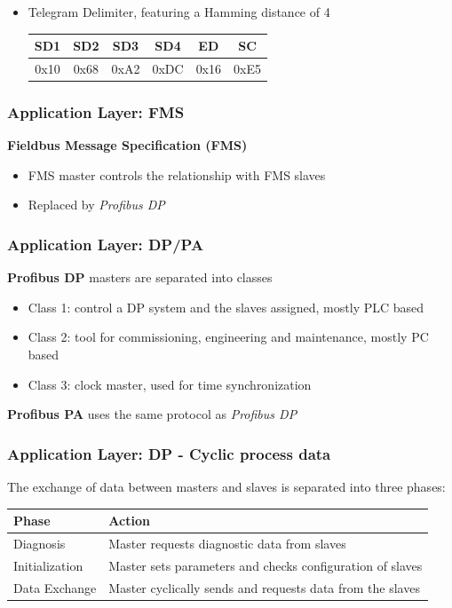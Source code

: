 \documentclass{beamer}
\begin{document}
\begin{frame}
\begin{itemize}
      \hfill \\
    \item Telegram Delimiter, featuring a Hamming distance of 4 \\
      \footnotesize
      \begin{tabular}[h]{|c|c|c|c|c|c|}
        \hline
        SD1   & SD2   & SD3   & SD4   & ED    & SC \\
        \hline
        0x10  & 0x68  & 0xA2  & 0xDC  & 0x16  & 0xE5 \\
        \hline
      \end{tabular}
      \normalsize
  \end{itemize}
\end{frame}

\begin{frame}
  \frametitle{Application Layer: FMS}
  \textbf{Fieldbus Message Specification (FMS)}
  \begin{itemize}
    \item FMS master controls the relationship with FMS slaves
    \item Replaced by \textit{Profibus DP}
  \end{itemize}
\end{frame}

\begin{frame}
  \frametitle{Application Layer: DP/PA}
  \textbf{Profibus DP} masters are separated into classes
  \begin{itemize}
    \item Class 1: control a DP system and the slaves assigned, mostly PLC based
    \item Class 2: tool for commissioning, engineering and maintenance, mostly PC
      based
    \item Class 3: clock master, used for time synchronization
  \end{itemize}
  \vspace{10pt}
  \textbf{Profibus PA} uses the same protocol as \textit{Profibus DP}
\end{frame}

\begin{frame}
  \frametitle{Application Layer: DP - Cyclic process data}
  The exchange of data between masters and slaves is separated into three
  phases:~\cite{profibusmanual}
  \begin{center}
    \footnotesize
    \begin{tabular}[h]{l|l}
      \textbf{Phase}  & \textbf{Action} \\
      \hline
      Diagnosis       & Master requests diagnostic data from slaves \\
      Initialization  & Master sets parameters and checks configuration of slaves \\
      Data Exchange   & Master cyclically sends and requests data from the slaves
    \end{tabular}
  \end{center}
\end{frame}
\end{document}
